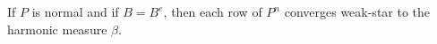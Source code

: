 If $P$ is normal and if $B = B^e$, then each row of $P^n$ converges weak-star to the harmonic measure $\beta$.
